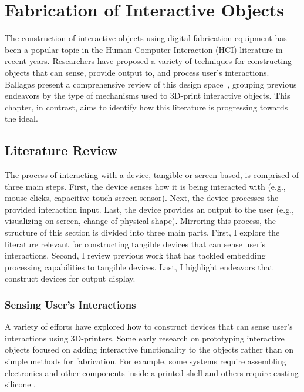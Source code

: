 \chapter{Fabrication of Interactive Objects} \label{ch:background}
  The construction of interactive objects using digital fabrication equipment
  has been a popular topic in the Human-Computer Interaction (HCI) literature in
  recent years. Researchers have proposed a variety of techniques for
  constructing objects that can sense, provide output to, and process user's
  interactions. Ballagas \etal present a comprehensive review of this design
  space~\cite{Ballagas:2018}, grouping previous endeavors by the type of
  mechanisms used to 3D-print interactive objects. This chapter, in contrast,
  aims to identify how this literature is progressing towards the \papf ideal.

  \section{\papf Literature Review}
    The process of interacting with a device, tangible or screen based, is
    comprised of three main steps. First, the device senses how it is being
    interacted with (e.g., mouse clicks, capacitive touch screen sensor).  Next,
    the device processes the provided interaction input. Last, the device
    provides an output to the user (e.g., visualizing on screen, change of
    physical shape). Mirroring this process, the structure of this section is
    divided into three main parts. First, I explore the literature relevant for
    constructing tangible devices that can sense user's interactions. Second, I
    review previous work that has tackled embedding processing capabilities to
    tangible devices. Last, I highlight endeavors that construct devices for
    output display.

    \subsection{Sensing User's Interactions} \label{sec:sensing}
      A variety of efforts have explored how to construct devices that can sense
      user's interactions using 3D-printers. Some early research on prototyping
      interactive objects focused on adding interactive functionality to the
      objects rather than on simple methods for fabrication. For example, some
      systems require assembling electronics and other components inside a
      printed shell \cite{Savage:2015ws, Savage:2013, Murray-Smith:2008,
      Hook:2014kp} and others require casting silicone \cite{He:2017, Rod:2017}.

